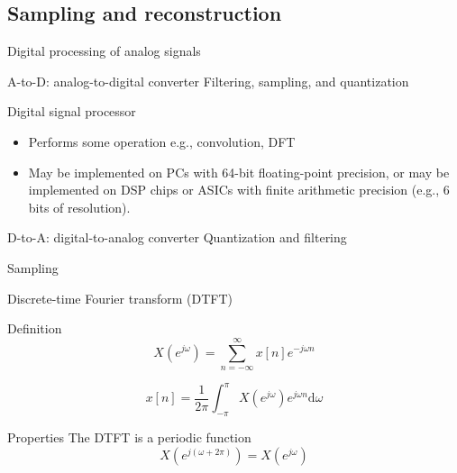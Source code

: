 \documentclass{beamer}
\begin{document}
\subsection{Sampling and reconstruction}
%
\begin{frame}{Digital processing of analog signals}

\begin{figure}[t!]
	\centering
	\resizebox{\linewidth}{!}{}
	\label{fig:adc-dsp-dac}
\end{figure}

\begin{block}{A-to-D: analog-to-digital converter}
Filtering, sampling, and quantization
\end{block}

\begin{block}{Digital signal processor}
\begin{itemize} \itemsep 0pt
	\item Performs some operation e.g., convolution, DFT
	\item May be implemented on PCs with 64-bit floating-point precision, or may be implemented on DSP chips or ASICs with finite arithmetic precision (e.g., 6 bits of resolution).
\end{itemize}
\end{block}
\begin{block}{D-to-A: digital-to-analog converter}
Quantization and filtering
\end{block}

\end{frame}

%
\begin{frame}{Sampling}




\end{frame}

%
\begin{frame}{Discrete-time Fourier transform (DTFT)}

\begin{block}{Definition}
\begin{equation} \tag{Direct transform}
X(e^{j\omega}) = \sum_{n=-\infty}^{\infty} x[n]e^{-j\omega n} 
\end{equation}

\begin{equation}\tag{Inverse transform}
x[n] = \frac{1}{2\pi}\int_{-\pi}^{\pi}X(e^{j\omega})e^{j\omega n}\mathrm{d}\omega
\end{equation}
\end{block}

\begin{block}{Properties}
The DTFT is a periodic function
\begin{equation*}
X(e^{j(\omega + 2\pi)}) = X(e^{j\omega})
\end{equation*}
\end{block}
\end{frame}
\end{document}
